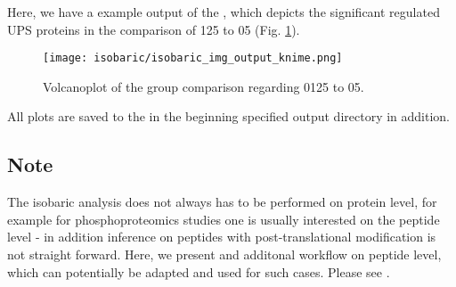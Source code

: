 \noindent  Here, we have a example output of the , which depicts the significant regulated  UPS proteins in the comparison of 125 to 05 (Fig. \ref{fig:isobaric_volcanoplot}). 

\begin{figure}[htbp]
  \centering
 \texttt{[image: isobaric/isobaric\_img\_output\_knime.png]}
  \caption{Volcanoplot of the group comparison regarding 0125 to 05.}
  \label{fig:isobaric_volcanoplot}
\end{figure}

\noindent  All plots are saved to the in the beginning specified output directory in addition. 

\subsection{Note}
The isobaric analysis does not always has to be performed on protein level, for example for phosphoproteomics studies one is usually  interested on the peptide level - in addition inference on peptides with post-translational modification is not straight forward. Here, we present and additonal workflow on peptide level, which can potentially be adapted and used for such cases. 
Please see .




